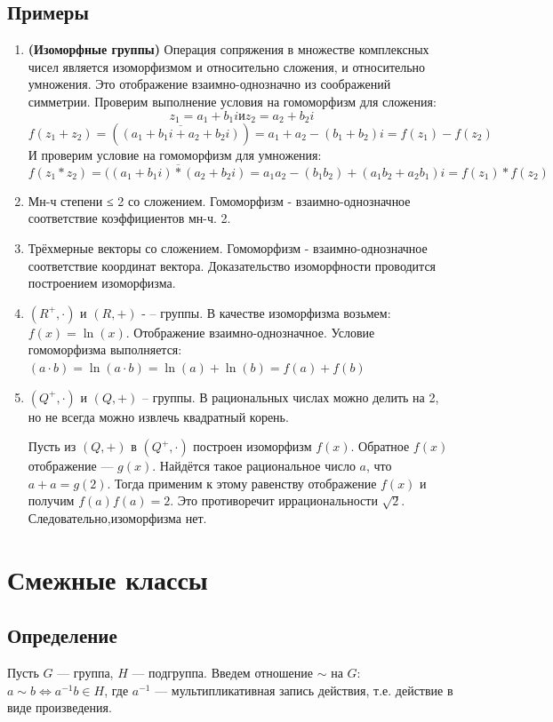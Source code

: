 \documentclass[12pt]{article}
\begin{document}
\subsection{Примеры}
\begin{enumerate}
    \item \textbf{(Изоморфные группы)} Операция сопряжения в множестве комплексных чисел является изоморфизмом и относительно сложения, и относительно умножения. Это отображение взаимно-однозначно из соображений симметрии. Проверим выполнение условия на гомоморфизм для сложения:
          \[
              z_1 = a_1 + b_1i  и z_2 = a_2 + b_2i
          \]
          \[
              f(z_1+z_2) = (\overline{(a_1 + b_1i + a_2 + b_2i)}) = a_1 + a_2 - (b_1 + b_2)i = f(z_1) - f(z_2)
          \]
          И проверим условие на гомоморфизм для умножения:
          \[
              f(z_1*z_2)=(\overline{(a_1+b_1i)*(a_2+b_2i)}=a_1a_2-(b_1b_2)+(a_1b_2+a_2b_1)i=f(z_1)*f(z_2)
          \]
    \item Мн-ч степени ≤ 2 со сложением. Гомоморфизм - взаимно-однозначное соответствие коэффициентов мн-ч. 2.
    \item Трёхмерные векторы со сложением. Гомоморфизм - взаимно-однозначное соответствие координат вектора. Доказательство изоморфности проводится построением изоморфизма.
    \item $(R^+,\cdot)$ и $(R,+)$ - – группы. В качестве изоморфизма возьмем: $f(x) = \ln(x)$. Отображение взаимно-однозначное.
          Условие гомоморфизма выполняется: $(a · b) = \ln(a · b) = \ln(a) + \ln(b) = f(a) + f(b)$

    \item $(Q^+,\cdot)$ и $(Q,+)$ – группы. В рациональных числах можно делить на 2, но не всегда можно извлечь квадратный корень.

          Пусть из $(Q,+)$ в $(Q^+, \cdot)$  построен изоморфизм $f(x)$. Обратное $f(x)$ отображение --- $g(x)$. Найдётся такое рациональное число $a$, что $a + a = g(2)$.
          Тогда применим к этому равенству отображение $f(x)$ и получим $f(a)f(a) = 2$. Это противоречит иррациональности $\sqrt{2}$. Следовательно,изоморфизма нет.
\end{enumerate}

\section{Смежные классы}
\subsection{Определение}
Пусть $G$ --- группа, $H$ --- подгруппа. Введем отношение $\sim$ на $G$: $a\sim b \Leftrightarrow a^{-1}b\in H$, где $a^{-1}$ ---
мультипликативная запись действия, т.е. действие в виде произведения.
\end{document}
